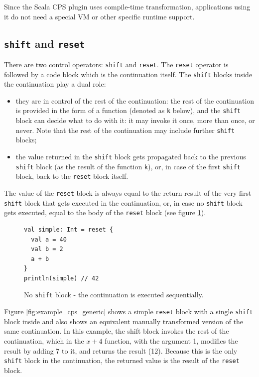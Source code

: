 Since the Scala CPS plugin uses compile-time transformation, applications using it do not need a special VM or other specific runtime support.

\subsection{\texttt{shift} and \texttt{reset}}

There are two control operators: \texttt{shift} and \texttt{reset}. The \texttt{reset} operator is followed by a code block which is the continuation itself. The \texttt{shift} blocks inside the continuation play a dual role: 
\begin{itemize}
\item they are in control of the rest of the continuation: the rest of the continuation is provided in the form of a function (denoted as \texttt{k} below), and the \texttt{shift} block can decide what to do with it: it may invoke it once, more than once, or never. Note that the rest of the continuation may include further \texttt{shift} blocks;
\item the value returned in the \texttt{shift} block gets propagated back to the previous \texttt{shift} block (as the result of the function \texttt{k}), or, in case of the first \texttt{shift} block, back to the \texttt{reset} block itself.
\end{itemize}

The value of the \texttt{reset} block is always equal to the return result of the very first \texttt{shift} block that gets executed in the continuation, or, in case no \texttt{shift} block gets executed, equal to the body of the \texttt{reset} block (see figure  \ref{fig:example_cps_no_shift}).

\begin{figure}[h!] 
\begin{lstlisting}
val simple: Int = reset {
  val a = 40
  val b = 2
  a + b
}
println(simple) // 42
\end{lstlisting}
\caption{No \texttt{shift} block - the continuation is executed sequentially.}
\label{fig:example_cps_no_shift}
\end{figure}

Figure \ref{fig:example_cps_generic} shows a simple \texttt{reset} block with a single \texttt{shift} block inside and also shows an equivalent manually transformed version of the same continuation. In this example, the shift block invokes the rest of the continuation, which in the \(x+4\) function, with the argument 1, modifies the result by adding 7 to it, and returns the result (12). Because this is the only \texttt{shift} block in the continuation, the returned value is the result of the \texttt{reset} block.

